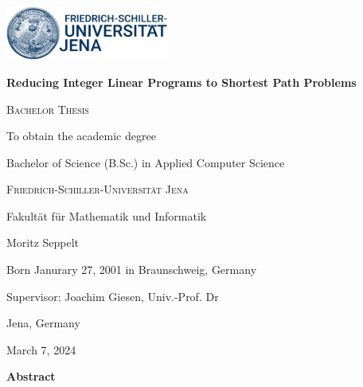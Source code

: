 \documentclass{report}
\theoremstyle{definition}
\begin{document}
\begin{titlepage}
  \centering
  \vspace*{0.5cm}
  \includegraphics[width=0.4\textwidth]{uni_jena_logo.png}\par
  \vspace{1cm}
  {\LARGE\textbf{Reducing Integer Linear Programs to Shortest Path Problems}\par}
  \vspace{1.5cm}
  {\Large \textsc{Bachelor Thesis}\par}
  \vspace{1.5cm}
  {\Large To obtain the academic degree\par}
  \vspace{0.5cm}
  {\Large Bachelor of Science (B.Sc.) in Applied Computer Science\par}
  \vspace{1.5cm}
  {\Large \textsc{Friedrich-Schiller-Universität Jena}\par}
  \vspace{0.5cm}
  {\Large Fakultät für Mathematik und Informatik\par}
  \vspace{0.5cm}
  {\Large \par}
  \vfill
  {\large Moritz Seppelt\par}
  {\large Born Janurary 27, 2001 in Braunschweig, Germany\par}
  \vspace{0.5cm}
  {\large Supervisor: Joachim Giesen, Univ.-Prof. Dr \par}
  \vfill
  {\large Jena, Germany\par}
  {\large March 7, 2024\par} %
\end{titlepage}

\newpage
\thispagestyle{empty}
\begin{center}
    \Large\textbf{Abstract}
\end{center}
\end{document}
